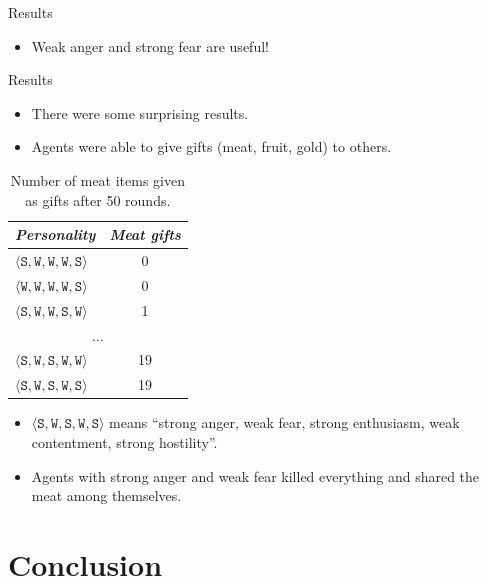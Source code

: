 \documentclass{beamer}
\newcommand{\tuple}[1]{\ensuremath{\langle #1 \rangle}}
\newcommand{\type}[1]{\mathtt{#1}}
\newcommand{\personality}[5]{\tuple{\type{#1},\type{#2}, \type{#3}, \type{#4}, \type{#5}}}
\begin{document}
\begin{frame}{Results}
      \begin{itemize}
         \item<3-> Weak anger and strong fear are useful!
      \end{itemize}
   \end{frame}
   
   \begin{frame}{Results}
      \begin{itemize}
         \item There were some surprising results.
         \item Agents were able to give gifts (meat, fruit, gold) to others.
      \end{itemize}
      
      \begin{table}
         \centering
            \begin{tabular}{ l | c }
               \emph{Personality} & \emph{Meat gifts} \\
               \hline

					$\personality{S}{W}{W}{W}{S}$ & 0\\
               $\personality{W}{W}{W}{W}{S}$ & 0\\
               $\personality{S}{W}{W}{S}{W}$ & 1\\
               \multicolumn{2}{c}{$\dots$}\\
               $\personality{S}{W}{S}{W}{W}$ & 19\\
               $\personality{S}{W}{S}{W}{S}$ & 19\\
               \hline
            \end{tabular}
            \caption{Number of meat items given as gifts after 50 rounds.}
            \label{tab:numWumpuses}
      \end{table}
      \begin{itemize}
         \item $\personality{S}{W}{S}{W}{S}$ means ``strong anger, weak fear, strong enthusiasm, weak contentment, strong hostility''.
         \item Agents with strong anger and weak fear killed everything and shared the meat among themselves.
      \end{itemize}
   \end{frame}
   
   \section{Conclusion}
   
\end{document}

